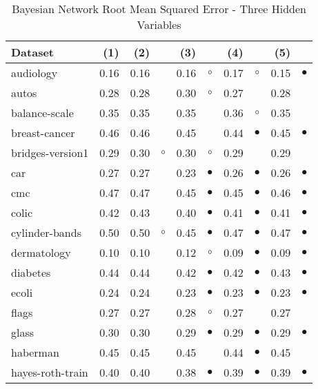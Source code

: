 \newpage
{\centering \footnotesize \begin{longtable}{lrr@{\hspace{0.1cm}}cr@{\hspace{0.1cm}}cr@{\hspace{0.1cm}}cr@{\hspace{0.1cm}}c}
\caption{\label{bnrmse3}Bayesian Network Root Mean Squared Error - Three Hidden Variables}
\\
\hline
Dataset & (1)& (2) & & (3) & & (4) & & (5) & \\
\hline
audiology & 0.16 & 0.16 &           & 0.16 &   $\circ$ & 0.17 &   $\circ$ & 0.15 & $\bullet$\\
autos & 0.28 & 0.28 &           & 0.30 &   $\circ$ & 0.27 &           & 0.28 &          \\
balance-scale & 0.35 & 0.35 &           & 0.35 &           & 0.36 &   $\circ$ & 0.35 &          \\
breast-cancer & 0.46 & 0.46 &           & 0.45 &           & 0.44 & $\bullet$ & 0.45 & $\bullet$\\
bridges-version1 & 0.29 & 0.30 &   $\circ$ & 0.30 &   $\circ$ & 0.29 &           & 0.29 &          \\
car & 0.27 & 0.27 &           & 0.23 & $\bullet$ & 0.26 & $\bullet$ & 0.26 & $\bullet$\\
cmc & 0.47 & 0.47 &           & 0.45 & $\bullet$ & 0.45 & $\bullet$ & 0.46 & $\bullet$\\
colic & 0.42 & 0.43 &           & 0.40 & $\bullet$ & 0.41 & $\bullet$ & 0.41 & $\bullet$\\
cylinder-bands & 0.50 & 0.50 &   $\circ$ & 0.45 & $\bullet$ & 0.47 & $\bullet$ & 0.47 & $\bullet$\\
dermatology & 0.10 & 0.10 &           & 0.12 &   $\circ$ & 0.09 & $\bullet$ & 0.09 & $\bullet$\\
diabetes & 0.44 & 0.44 &           & 0.42 & $\bullet$ & 0.42 & $\bullet$ & 0.43 & $\bullet$\\
ecoli & 0.24 & 0.24 &           & 0.23 & $\bullet$ & 0.23 & $\bullet$ & 0.23 & $\bullet$\\
flags & 0.27 & 0.27 &           & 0.28 &   $\circ$ & 0.27 &           & 0.27 &          \\
glass & 0.30 & 0.30 &           & 0.29 & $\bullet$ & 0.29 & $\bullet$ & 0.29 & $\bullet$\\
haberman & 0.45 & 0.45 &           & 0.45 &           & 0.44 & $\bullet$ & 0.45 &          \\
hayes-roth-train & 0.40 & 0.40 &           & 0.38 & $\bullet$ & 0.39 & $\bullet$ & 0.39 & $\bullet$\\

\end{longtable}}
